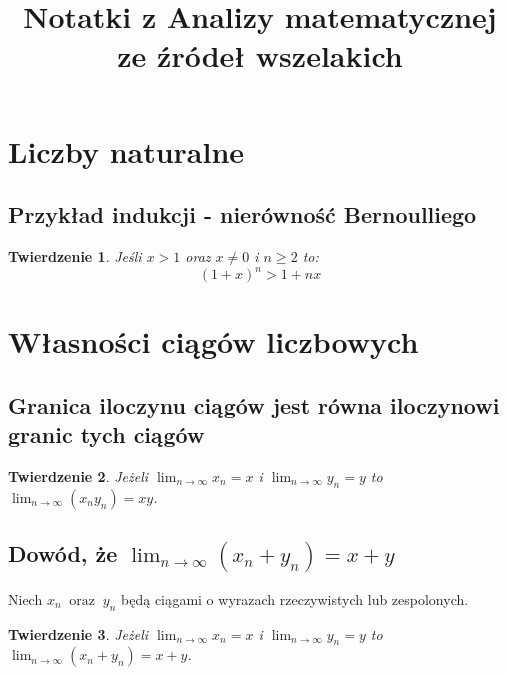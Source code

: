 \documentclass[a4paper,oneside,openright,11pt]{article}
\title{Notatki z Analizy matematycznej ze źródeł wszelakich}
\author{}
\date{}
\newtheorem{theorem}{Twierdzenie}
\numberwithin{equation}{section}
\begin{document}
\begin{titlepage}
\maketitle
\end{titlepage}



\tableofcontents

\section{Liczby naturalne}

\subsection{Przykład indukcji - nierówność Bernoulliego}

\begin{theorem}
    Jeśli $x > 1$ oraz $x \neq 0$ i $n \geq 2$ to:
    \begin{equation*}
        (1 + x)^{n} > 1 + nx
    \end{equation*}
\end{theorem}


\section{Własności ciągów liczbowych}
\subsection{Granica iloczynu ciągów jest równa  iloczynowi granic tych ciągów}



\begin{theorem}
    
    Jeżeli $\lim_{n\to\infty} x_n = x$ i $\lim_{n\to\infty} y_n = y$ 
     to $\lim_{n\to\infty} (x_{n}y_{n}) = xy$.

\end{theorem}

\subsection{Dowód, że $\lim_{n\to\infty} (x_{n} + y_{n}) = x + y$}

Niech $x_{n} \;\; \textrm{oraz} \;\; y_{n}$ będą ciągami o wyrazach rzeczywistych  lub zespolonych.

\begin{theorem}
    
    Jeżeli $\lim_{n\to\infty} x_n = x$ i $\lim_{n\to\infty} y_n = y$ 
     to $\lim_{n\to\infty} (x_{n} + y_{n}) = x + y$.

\end{theorem}
\end{document}
